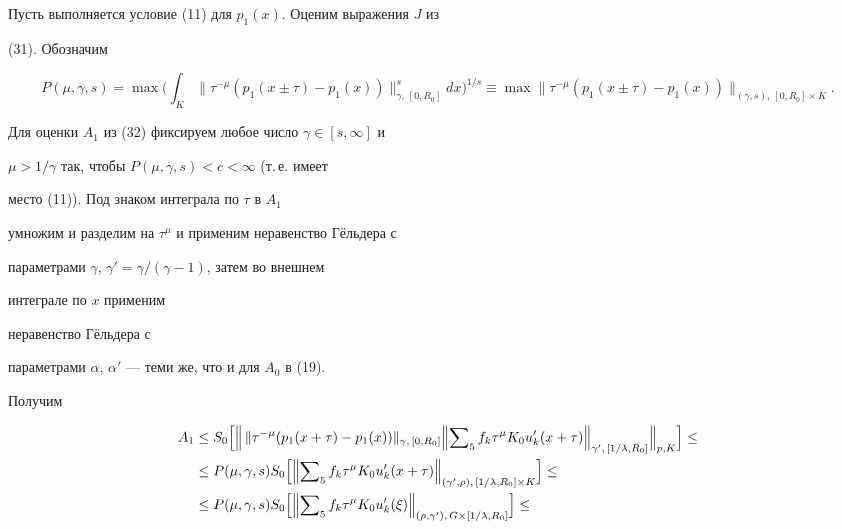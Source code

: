 {Пусть выполняется условие (11) для $p_1(x)$. Оценим выражения $J$ из


(31). Обозначим


$$


P(\mu,\gamma,s)=\max\biggl(\int_K\|\tau^{-\mu}


(p_1(x\pm\tau)-p_1(x))\|^s_{\gamma,\,[0,R_0]}dx


\biggr)^{1/s}\equiv \max\|\tau^{-\mu}(p_1(x\pm\tau)-


p_1(x))\|_{(\gamma,s),\,[0,R_0]\times K}.


$$


Для оценки $A_1$ из (32) фиксируем любое число $\gamma\in[s,\infty]$ и


$\mu>1/\gamma$ так, чтобы $P(\mu,\gamma,s)<c<\infty$ (т.\,е. имеет


место (11)). Под знаком интеграла по $\tau$ в $A_1$


умножим и разделим на $\tau^\mu$ и применим неравенство Г\"ельдера с


параметрами $\gamma$, $\gamma'=\gamma/(\gamma-1)$, затем во внешнем


интеграле по $x$ применим


неравенство Г\"ельдера с


параметрами $\alpha$, $\alpha'$ --- теми же, что и для $A_0$ в (19).


Получим


\begin{align}


A_1&\le S_0\Bigl[\Bigl\|\,\|\tau^{-\mu}(p_1(x+\tau)-


p_1(x))\|_{\gamma,\,[0,R_0]}\Bigl\|\sumn_5 f_k\tau^\mu


K_0u'_k(x+\tau)\Bigr\|_{\gamma',\,[1/\lambda,R_0]}


\Bigr\|_{p,K}\Bigr]\le \notag \\


%


&\le P(\mu,\gamma,s)S_0\Bigl[\Bigl\|\sumn_5 f_k\tau^\mu


K_0u'_k(x+\tau)


\Bigr\|_{(\gamma',\rho),\,[1/\lambda,R_0]\times K}\Bigr]


\le\notag \\


%


&\le P(\mu,\gamma,s)S_0\Bigl[\Bigl\|\sumn_5 f_k\tau^\mu K_0u'_k(\xi)


\Bigr\|_{(\rho,\gamma'),\,G\times[1/\lambda,R_0]}\Bigr]


\le\notag \\



\end{align}}
